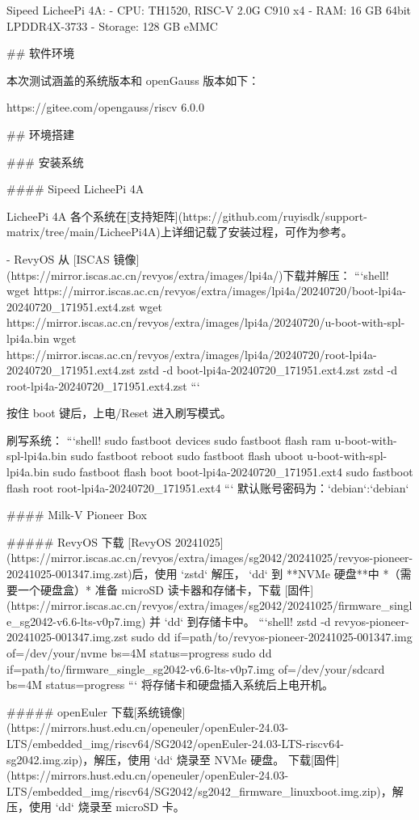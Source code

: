\documentclass{article}
\begin{document}
\begin{markdown}
Sipeed LicheePi 4A:
- CPU: TH1520, RISC-V 2.0G C910 x4
- RAM: 16 GB 64bit LPDDR4X-3733
- Storage: 128 GB eMMC

## 软件环境

本次测试涵盖的系统版本和 openGauss 版本如下：

https://gitee.com/opengauss/riscv 6.0.0

## 环境搭建

### 安装系统

#### Sipeed LicheePi 4A

LicheePi 4A 各个系统在[支持矩阵](https://github.com/ruyisdk/support-matrix/tree/main/LicheePi4A)上详细记载了安装过程，可作为参考。

- RevyOS
从 [ISCAS 镜像](https://mirror.iscas.ac.cn/revyos/extra/images/lpi4a/)下载并解压：
```shell!
wget https://mirror.iscas.ac.cn/revyos/extra/images/lpi4a/20240720/boot-lpi4a-20240720_171951.ext4.zst
wget https://mirror.iscas.ac.cn/revyos/extra/images/lpi4a/20240720/u-boot-with-spl-lpi4a.bin
wget https://mirror.iscas.ac.cn/revyos/extra/images/lpi4a/20240720/root-lpi4a-20240720_171951.ext4.zst
zstd -d boot-lpi4a-20240720_171951.ext4.zst
zstd -d root-lpi4a-20240720_171951.ext4.zst
```

按住 boot 键后，上电/Reset 进入刷写模式。

刷写系统：
```shell!
sudo fastboot devices
sudo fastboot flash ram u-boot-with-spl-lpi4a.bin 
sudo fastboot reboot
sudo fastboot flash uboot u-boot-with-spl-lpi4a.bin
sudo fastboot flash boot boot-lpi4a-20240720_171951.ext4
sudo fastboot flash root root-lpi4a-20240720_171951.ext4
```
默认账号密码为：`debian`:`debian`

#### Milk-V Pioneer Box

##### RevyOS
下载 [RevyOS 20241025](https://mirror.iscas.ac.cn/revyos/extra/images/sg2042/20241025/revyos-pioneer-20241025-001347.img.zst)后，使用 `zstd` 解压， `dd` 到 **NVMe 硬盘**中 *（需要一个硬盘盒）*
准备 microSD 读卡器和存储卡，下载 [固件](https://mirror.iscas.ac.cn/revyos/extra/images/sg2042/20241025/firmware_single_sg2042-v6.6-lts-v0p7.img) 并 `dd` 到存储卡中。
```shell!
zstd -d revyos-pioneer-20241025-001347.img.zst
sudo dd if=path/to/revyos-pioneer-20241025-001347.img of=/dev/your/nvme bs=4M status=progress
sudo dd if=path/to/firmware_single_sg2042-v6.6-lts-v0p7.img of=/dev/your/sdcard bs=4M status=progress
```
将存储卡和硬盘插入系统后上电开机。

##### openEuler
下载[系统镜像](https://mirrors.hust.edu.cn/openeuler/openEuler-24.03-LTS/embedded_img/riscv64/SG2042/openEuler-24.03-LTS-riscv64-sg2042.img.zip)，解压，使用 `dd` 烧录至 NVMe 硬盘。
下载[固件](https://mirrors.hust.edu.cn/openeuler/openEuler-24.03-LTS/embedded_img/riscv64/SG2042/sg2042_firmware_linuxboot.img.zip)，解压，使用 `dd` 烧录至 microSD 卡。


\end{markdown}
\end{document}

